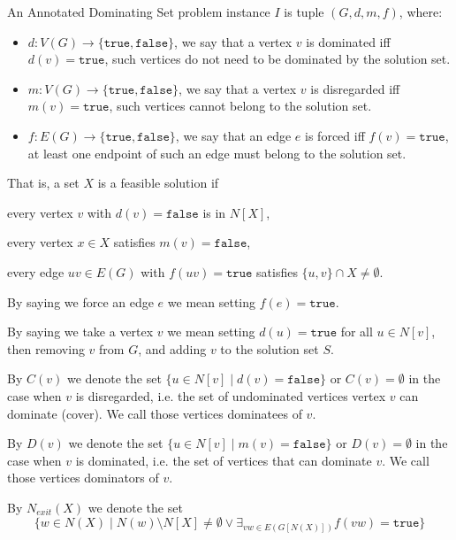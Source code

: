 \documentclass[a4paper,UKenglish,cleveref, autoref, thm-restate]{lipics-v2021}
\begin{document}
An Annotated Dominating Set problem instance $I$ is tuple $(G, d, m, f)$, where:
\begin{itemize}
    \item $d: V(G) \to \{\texttt{true}, \texttt{false}\}$, we say that a vertex $v$ is dominated iff $d(v) = \texttt{true}$, such vertices do not need to be dominated by the solution set.
    \item $m: V(G) \to \{\texttt{true}, \texttt{false}\}$, we say that a vertex $v$ is disregarded iff $m(v) = \texttt{true}$, such vertices cannot belong to the solution set.
    \item $f: E(G) \to \{\texttt{true}, \texttt{false}\}$, we say that an edge $e$ is forced iff $f(v) = \texttt{true}$, at least one endpoint of such an edge must belong to the solution set.
\end{itemize}
That is, a set $X$ is a feasible solution if
\begin{alphaenumerate}
\item every vertex $v$ with $d(v) = \texttt{false}$ is in $N[X]$, 
\item every vertex $x \in X$ satisfies $m(v) = \texttt{false}$, 
\item every edge $uv \in E(G)$ with $f(uv) = \texttt{true}$ satisfies
$\{u,v\} \cap X \neq \emptyset$.
\end{alphaenumerate}
By saying we force an edge $e$ we mean setting $f(e) = \texttt{true}$.

By saying we take a vertex $v$ we mean setting $d(u) = \texttt{true}$ for all $u \in N[v]$, then removing $v$ from $G$, and adding $v$ to the solution set $S$.

By $C(v)$ we denote the set $\{u \in N[v] \mid d(v) = \texttt{false}\}$ or $C(v) = \emptyset$ in the case when $v$ is disregarded, i.e. the set of undominated vertices vertex $v$ can dominate (cover). We call those vertices dominatees of $v$.

By $D(v)$ we denote the set $\{u \in N[v] \mid m(v) = \texttt{false}\}$ or $D(v) = \emptyset$ in the case when $v$ is dominated, i.e. the set of vertices that can dominate $v$. We call those vertices dominators of $v$.

By $N_{exit}(X)$ we denote the set $$\{w \in N(X) \mid N(w) \setminus N[X] \neq \emptyset \vee \exists_{vw \in E(G[N(X)])} f(vw) = \texttt{true}\}$$
\end{document}
